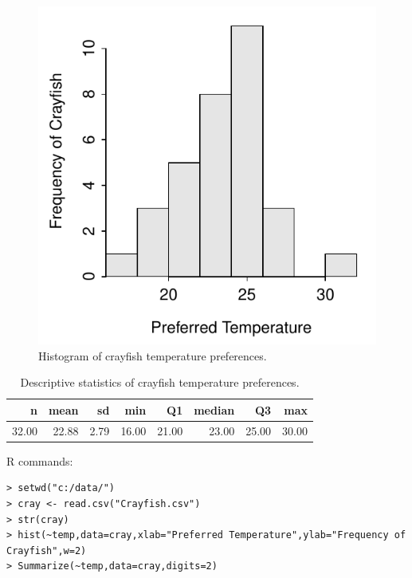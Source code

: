 \documentclass[10pt,openany]{book}\usepackage[]{graphicx}\usepackage[]{color}
\makeatletter
\newenvironment{kframe}{%
 \def\at@end@of@kframe{}%
 \ifinner\ifhmode%
  \def\at@end@of@kframe{\end{minipage}}%
  \begin{minipage}{\columnwidth}%
 \fi\fi%
 \def\FrameCommand##1{\hskip\@totalleftmargin \hskip-\fboxsep
 \colorbox{shadecolor}{##1}\hskip-\fboxsep
     \hskip-\linewidth \hskip-\@totalleftmargin \hskip\columnwidth}%
 \MakeFramed {\advance\hsize-\width
   \@totalleftmargin\z@ \linewidth\hsize
   \@setminipage}}%
 {\par\unskip\endMakeFramed%
 \at@end@of@kframe}
\newenvironment{knitrout}{}{} %
\makeatother
\begin{document}
\begin{knitrout}
\color{fgcolor}\begin{figure}[hbtp]

{\centering \includegraphics[width=.4\linewidth]{Figs/CrayfishTempHist-1} 

}

\caption[Histogram of crayfish temperature preferences]{Histogram of crayfish temperature preferences.}\label{fig:CrayfishTempHist}
\end{figure}


\end{knitrout}

\begin{table}[ht]
\centering
\caption{Descriptive statistics of crayfish temperature preferences.} 
\label{tab:CrayfishTempStats}
\begin{tabular}{rrrrrrrr}
  \hline
n & mean & sd & min & Q1 & median & Q3 & max \\ 
  \hline
32.00 & 22.88 & 2.79 & 16.00 & 21.00 & 23.00 & 25.00 & 30.00 \\ 
   \hline
\end{tabular}
\end{table}


\begin{minipage}{\textwidth}
R commands:
\begin{knitrout}
\color{fgcolor}\begin{kframe}
\begin{verbatim}
> setwd("c:/data/")
> cray <- read.csv("Crayfish.csv")
> str(cray)
> hist(~temp,data=cray,xlab="Preferred Temperature",ylab="Frequency of Crayfish",w=2)
> Summarize(~temp,data=cray,digits=2)
\end{verbatim}
\end{kframe}
\end{knitrout}
\end{minipage}
\end{document}
